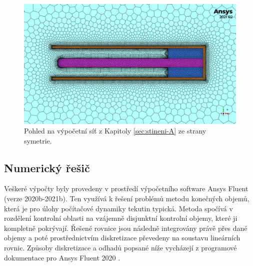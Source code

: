         \begin{figure}
            \centering
            \includegraphics[width=\textwidth]{300_VYPOCETNI_MODEL/mesh_sym_odvetrani_A.png}
            \caption{Pohled na výpočetní síť z Kapitoly \ref{sec:stineni-A} ze strany symetrie.}
            \label{fig:sit-detail-stineni-A}
        \end{figure}
        
    \subsection{Numerický řešič}
        Veškeré výpočty byly provedeny v prostředí výpočetního software Ansys Fluent (verze 2020b-2021b). Ten využívá k řešení problémů metodu konečných objemů, která je pro úlohy počítačové dynamiky tekutin typická. Metoda spočívá v rozdělení kontrolní oblasti na vzájemně disjunktní kontrolní objemy, které ji kompletně pokrývají. Řešené rovnice jsou následně integrovány právě přes dané objemy a poté prostřednictvím diskretizace převedeny na soustavu lineárních rovnic. Způsoby diskretizace a odhadů popsané níže vycházejí z programové dokumentace pro Ansys Fluent 2020 \cite{Ansys2020Theory}.
